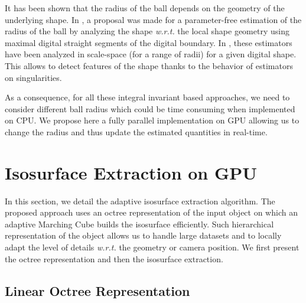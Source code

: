 \documentclass{llncs}
\newcommand{\wrt}{\emph{w.r.t.} }
\begin{document}
It has been shown that the radius of the ball depends on the geometry of the
underlying shape. In \cite{DGCI2014}, a proposal was made for a parameter-free
estimation of the radius of the ball by analyzing the shape \wrt the local shape
geometry using maximal digital straight segments of the digital boundary. In
\cite{SMI2015}, these estimators have been analyzed in scale-space (for a range of radii)  for a given digital shape. This allows to detect features of the
shape thanks to the behavior of estimators on singularities.

As a consequence, for all these integral invariant based approaches, we need to
consider different ball radius which could be time consuming when implemented on
CPU. We propose here a fully parallel implementation on GPU allowing us to
change the radius and thus update the estimated quantities in real-time.

\section{Isosurface Extraction on GPU}
\label{sec:isos-extr-gpu}

In this section, we detail the adaptive isosurface extraction
algorithm.
The proposed approach uses an octree representation of the input object
on which an adaptive Marching Cube builds the isosurface efficiently.
Such
hierarchical representation of the object allows us
to handle large datasets and to locally adapt the level of details
\wrt the geometry or camera position. We first present the
octree representation and then the isosurface extraction.

\subsection{Linear Octree Representation}
\end{document}
